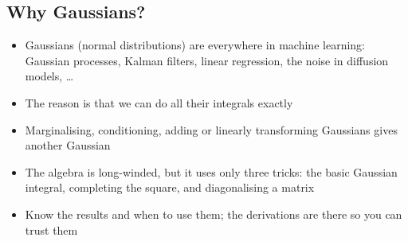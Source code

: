 \begin{slide}
\section{Why Gaussians?}

\begin{PauseHighLight}
  \begin{itemize}\squeeze
  \item Gaussians (normal distributions) are everywhere in machine
    learning: Gaussian processes, Kalman filters, linear regression,
    the noise in diffusion models, \ldots\pause
  \item The reason is that we can do all their integrals exactly\pause
  \item Marginalising, conditioning, adding or linearly transforming
    Gaussians gives another Gaussian\pause
  \item The algebra is long-winded, but it uses only three tricks: the
    basic Gaussian integral, completing the square, and diagonalising
    a matrix\pause
  \item Know the results and when to use them; the derivations are
    there so you can trust them\pause
  \end{itemize}
\end{PauseHighLight}

\end{slide}


